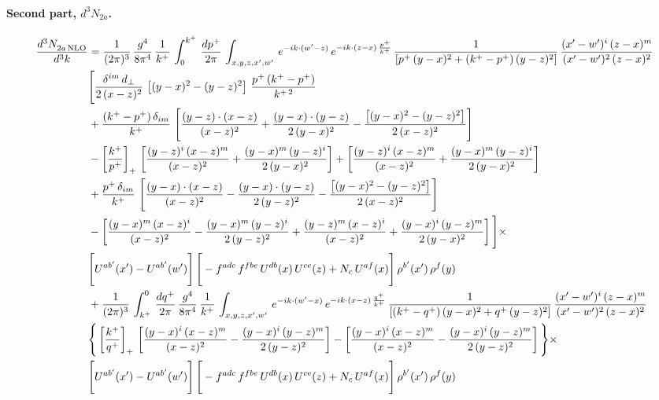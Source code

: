 \documentclass[10pt]{article}
\numberwithin{equation}{section}
\begin{document}
\paragraph{Second part, $d^3N_{2a}$.}
\begin{align}
    \frac{d^{3}N_{2a\,\rm NLO}^{\rm}}{d^{3}k}  & =   \frac{1}{(2\pi)^{3}}\, \frac{g^{4}}{8\pi^{4}}\,\frac{1}{k^{+}}\,\int_{0}^{k^{+}}\, \frac{dp^{+}}{2\pi}\,\int_{x,y,z,x',w'}\,e^{-ik\cdot(w'-z)}\,e^{-ik\cdot (z-x)\,\frac{p^{+}}{k^{+}}}\,\frac{1}{\left[p^{+}\,(y-x)^{2}+(k^{+}-p^{+})\,(y-z)^{2}\right]}\, \frac{(x'-w')^{i}\,(z-x)^{m}}{(x'-w')^{2}\,(z-x)^{2}} \notag \\ & \Bigg[\frac{\delta^{im}\,d_{\perp}}{2\,(x-z)^{2}}\,\left[(y-x)^{2}-(y-z)^{2}\right]\,\frac{p^{+}\,(k^{+}-p^{+})}{k^{+\,2}}\notag \\ & +\frac{(k^{+}-p^{+})\,\delta_{im}}{k^{+}}\,\left[\frac{(y-z)\cdot (x-z)}{(x-z)^{2}}+\frac{(y-x)\cdot (y-z)}{2\,(y-x)^{2}}-\frac{\left[(y-x)^{2}-(y-z)^{2}\right]}{2\,(x-z)^{2}}\right]\notag \\ & -\left[\frac{k^{+}}{p^{+}}\right]_{+}\,\left[\frac{(y-z)^{i}\,(x-z)^{m}}{(x-z)^{2}}+\frac{(y-x)^{m}\,(y-z)^{i}}{2\,(y-x)^{2}}\right]+ \left[\frac{(y-z)^{i}\,(x-z)^{m}}{(x-z)^{2}}+\frac{(y-x)^{m}\,(y-z)^{i}}{2\,(y-x)^{2}}\right]\notag \\ & +\frac{p^{+}\,\delta_{im}}{k^{+}}\,\left[\frac{(y-x)\cdot (x-z)}{(x-z)^{2}}-\frac{(y-x)\cdot (y-z)}{2\,(y-z)^{2}}-\frac{\left[(y-x)^{2}-(y-z)^{2}\right]}{2\,(x-z)^{2}}\right]\notag \\ &-\left[\frac{(y-x)^{m}\,(x-z)^{i}}{(x-z)^{2}}-\frac{(y-x)^{m}\,(y-z)^{i}}{2\,(y-z)^{2}}+\frac{(y-z)^{m}\,(x-z)^{i}}{(x-z)^{2}}+\frac{(y-x)^{i}\,(y-z)^{m}}{2\,(y-x)^{2}}\right]\Bigg]\times \notag \\ & \Bigg[U^{ab'}(x')-U^{ab'}(w')\Bigg]\,\Bigg[-f^{adc}\,f^{fbe}\,U^{db}(x)\,U^{ce}(z)+N_{c}\,U^{af}(x)\Bigg]\,\rho^{b'}(x')\,\rho^{f}(y) \notag \\
& + \frac{1}{(2\pi)^{3}}\,\int^{0}_{k^{+}}\, \frac{dq^{+}}{2\pi} \,\frac{g^{4}}{8\pi^{4}}\,\frac{1}{k^{+}}\, \int_{x,y,z,x',w'}\,e^{-ik\cdot(w'-x)}\,e^{-ik\cdot (x-z)\,\frac{q^{+}}{k^{+}}}\, \frac{1}{\left[(k^{+}-q^{+})\,(y-x)^{2}+q^{+}\,(y-z)^{2}\right]}\, \frac{(x'-w')^{i}\,(z-x)^{m}}{(x'-w')^{2}\,(z-x)^{2}} \notag \\ &\Bigg\{\left[\frac{k^{+}}{q^{+}}\right]_{+}\,\left[\frac{(y-x)^{i}\,(x-z)^{m}}{(x-z)^{2}}-\frac{(y-x)^{i}\,(y-z)^{m}}{2\,(y-z)^{2}}\right] -\left[\frac{(y-x)^{i}\,(x-z)^{m}}{(x-z)^{2}}-\frac{(y-x)^{i}\,(y-z)^{m}}{2\,(y-z)^{2}}\right]\Bigg\}\times\,\notag \\ & \Bigg[U^{ab'}(x')-U^{ab'}(w')\Bigg]\,\Bigg[-f^{adc}\,f^{fbe}\,U^{db}(x)\,U^{ce}(z)+N_{c}\,U^{af}(x)\Bigg]\,\rho^{b'}(x')\,\rho^{f}(y)
\end{align}
\end{document}
